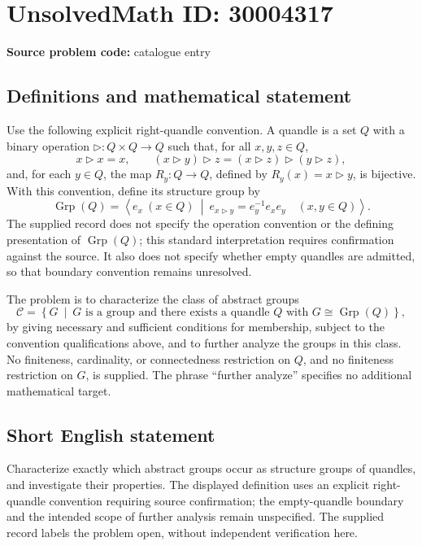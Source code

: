 \documentclass[11pt]{article}
\begin{document}
\section*{UnsolvedMath ID: 30004317}
\textbf{Source problem code:} catalogue entry
\subsection{Definitions and mathematical statement}
Use the following explicit right-quandle convention. A quandle is a set \(Q\) with a binary operation \(\triangleright:Q\times Q\to Q\) such that, for all \(x,y,z\in Q\),
\[
x\triangleright x=x,\qquad
(x\triangleright y)\triangleright z=(x\triangleright z)\triangleright(y\triangleright z),
\]
and, for each \(y\in Q\), the map \(R_y:Q\to Q\), defined by \(R_y(x)=x\triangleright y\), is bijective. With this convention, define its structure group by
\[
\operatorname{Grp}(Q)=\left\langle e_x\ (x\in Q)\ \middle|\ e_{x\triangleright y}=e_y^{-1}e_xe_y\quad(x,y\in Q)\right\rangle.
\]
The supplied record does not specify the operation convention or the defining presentation of \(\operatorname{Grp}(Q)\); this standard interpretation requires confirmation against the source. It also does not specify whether empty quandles are admitted, so that boundary convention remains unresolved.

The problem is to characterize the class of abstract groups
\[
\mathcal C=\left\{G\ \middle|\ G\text{ is a group and there exists a quandle }Q\text{ with }G\cong\operatorname{Grp}(Q)\right\},
\]
by giving necessary and sufficient conditions for membership, subject to the convention qualifications above, and to further analyze the groups in this class. No finiteness, cardinality, or connectedness restriction on \(Q\), and no finiteness restriction on \(G\), is supplied. The phrase ``further analyze'' specifies no additional mathematical target.
\subsection{Short English statement}
Characterize exactly which abstract groups occur as structure groups of quandles, and investigate their properties. The displayed definition uses an explicit right-quandle convention requiring source confirmation; the empty-quandle boundary and the intended scope of further analysis remain unspecified. The supplied record labels the problem open, without independent verification here.
\end{document}
